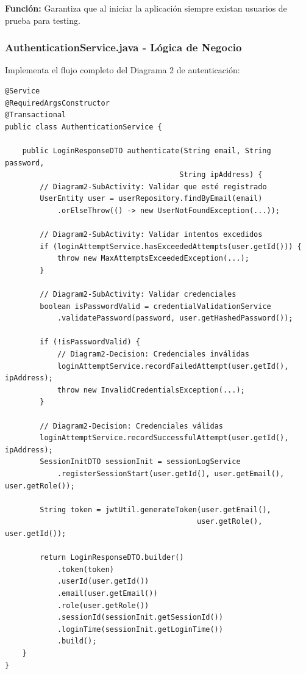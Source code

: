 \documentclass[11pt,a4paper]{article}
\begin{document}
\textbf{Función:} Garantiza que al iniciar la aplicación siempre existan usuarios de prueba para testing.

\subsubsection{AuthenticationService.java - Lógica de Negocio}

Implementa el flujo completo del Diagrama 2 de autenticación:

\begin{verbatim}
@Service
@RequiredArgsConstructor
@Transactional
public class AuthenticationService {
    
    public LoginResponseDTO authenticate(String email, String password, 
                                        String ipAddress) {
        // Diagram2-SubActivity: Validar que esté registrado
        UserEntity user = userRepository.findByEmail(email)
            .orElseThrow(() -> new UserNotFoundException(...));
        
        // Diagram2-SubActivity: Validar intentos excedidos
        if (loginAttemptService.hasExceededAttempts(user.getId())) {
            throw new MaxAttemptsExceededException(...);
        }
        
        // Diagram2-SubActivity: Validar credenciales
        boolean isPasswordValid = credentialValidationService
            .validatePassword(password, user.getHashedPassword());
        
        if (!isPasswordValid) {
            // Diagram2-Decision: Credenciales inválidas
            loginAttemptService.recordFailedAttempt(user.getId(), ipAddress);
            throw new InvalidCredentialsException(...);
        }
        
        // Diagram2-Decision: Credenciales válidas
        loginAttemptService.recordSuccessfulAttempt(user.getId(), ipAddress);
        SessionInitDTO sessionInit = sessionLogService
            .registerSessionStart(user.getId(), user.getEmail(), user.getRole());
        
        String token = jwtUtil.generateToken(user.getEmail(), 
                                            user.getRole(), user.getId());
        
        return LoginResponseDTO.builder()
            .token(token)
            .userId(user.getId())
            .email(user.getEmail())
            .role(user.getRole())
            .sessionId(sessionInit.getSessionId())
            .loginTime(sessionInit.getLoginTime())
            .build();
    }
}
\end{verbatim}
\end{document}
